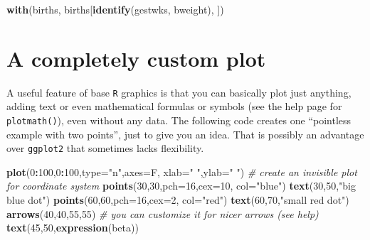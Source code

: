 \documentclass[
]{book}
\newenvironment{Shaded}{\begin{snugshade}}{\end{snugshade}}
\newcommand{\AttributeTok}[1]{\textcolor[rgb]{0.13,0.29,0.53}{#1}}
\newcommand{\CommentTok}[1]{\textcolor[rgb]{0.56,0.35,0.01}{\textit{#1}}}
\newcommand{\DecValTok}[1]{\textcolor[rgb]{0.00,0.00,0.81}{#1}}
\newcommand{\FunctionTok}[1]{\textcolor[rgb]{0.13,0.29,0.53}{\textbf{#1}}}
\newcommand{\NormalTok}[1]{#1}
\newcommand{\SpecialCharTok}[1]{\textcolor[rgb]{0.81,0.36,0.00}{\textbf{#1}}}
\newcommand{\StringTok}[1]{\textcolor[rgb]{0.31,0.60,0.02}{#1}}
\theoremstyle{definition}
\theoremstyle{definition}
\theoremstyle{definition}
\theoremstyle{definition}
\theoremstyle{remark}
\begin{document}
\begin{Shaded}
\begin{Highlighting}[]
\FunctionTok{with}\NormalTok{(births, births[}\FunctionTok{identify}\NormalTok{(gestwks, bweight), ])}
\end{Highlighting}
\end{Shaded}

\section{A completely custom plot}\label{a-completely-custom-plot}

A useful feature of base \texttt{R} graphics is that you can basically plot just anything, adding text or even mathematical formulas or symbols (see the help page for \texttt{plotmath()}), even without any data. The following code creates one ``pointless example with two points'', just to give you an idea. That is possibly an advantage over \texttt{ggplot2} that sometimes lacks flexibility.

\begin{Shaded}
\begin{Highlighting}[]
\FunctionTok{plot}\NormalTok{(}\DecValTok{0}\SpecialCharTok{:}\DecValTok{100}\NormalTok{,}\DecValTok{0}\SpecialCharTok{:}\DecValTok{100}\NormalTok{,}\AttributeTok{type=}\StringTok{"n"}\NormalTok{,}\AttributeTok{axes=}\NormalTok{F, }\AttributeTok{xlab=}\StringTok{" "}\NormalTok{,}\AttributeTok{ylab=}\StringTok{" "}\NormalTok{) }\CommentTok{\# create an invisible plot for coordinate system}
 \FunctionTok{points}\NormalTok{(}\DecValTok{30}\NormalTok{,}\DecValTok{30}\NormalTok{,}\AttributeTok{pch=}\DecValTok{16}\NormalTok{,}\AttributeTok{cex=}\DecValTok{10}\NormalTok{, }\AttributeTok{col=}\StringTok{"blue"}\NormalTok{)}
 \FunctionTok{text}\NormalTok{(}\DecValTok{30}\NormalTok{,}\DecValTok{50}\NormalTok{,}\StringTok{"big blue dot"}\NormalTok{)}
 \FunctionTok{points}\NormalTok{(}\DecValTok{60}\NormalTok{,}\DecValTok{60}\NormalTok{,}\AttributeTok{pch=}\DecValTok{16}\NormalTok{,}\AttributeTok{cex=}\DecValTok{2}\NormalTok{, }\AttributeTok{col=}\StringTok{"red"}\NormalTok{)}
 \FunctionTok{text}\NormalTok{(}\DecValTok{60}\NormalTok{,}\DecValTok{70}\NormalTok{,}\StringTok{"small red dot"}\NormalTok{)}
 \FunctionTok{arrows}\NormalTok{(}\DecValTok{40}\NormalTok{,}\DecValTok{40}\NormalTok{,}\DecValTok{55}\NormalTok{,}\DecValTok{55}\NormalTok{) }\CommentTok{\# you can customize it for nicer arrows (see help)}
 \FunctionTok{text}\NormalTok{(}\DecValTok{45}\NormalTok{,}\DecValTok{50}\NormalTok{,}\FunctionTok{expression}\NormalTok{(beta)) }
\end{Highlighting}
\end{Shaded}
\end{document}
